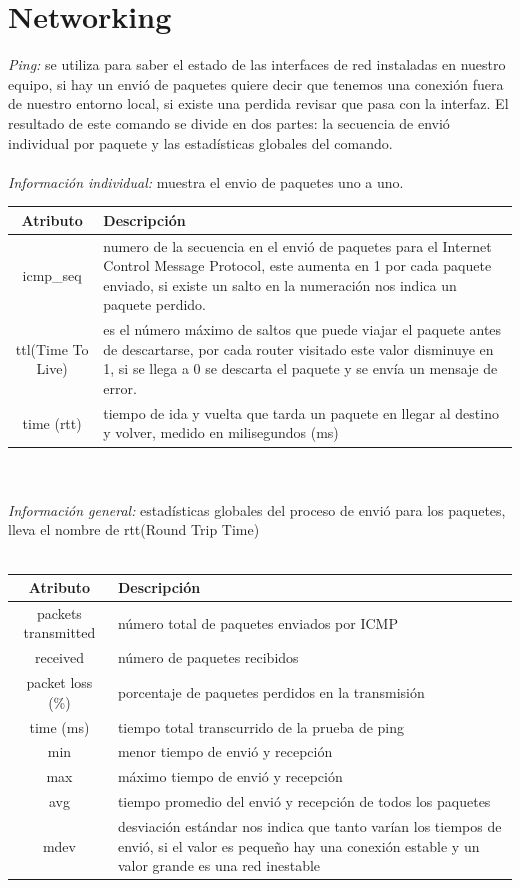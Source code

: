 \documentclass[10pt,a4paper,titlepage]{article}
\begin{document}
	\section*{Networking}
	\emph{Ping:} se utiliza para saber el estado de las interfaces de red instaladas en nuestro equipo, si hay un envió de paquetes quiere decir que tenemos una conexión fuera de nuestro entorno local, si existe una perdida revisar que pasa con la interfaz. El resultado de este comando se divide en dos partes: la secuencia de envió individual por paquete y las estadísticas globales del comando.
	\\
	\\
	\emph{Información individual:} muestra el envio de paquetes uno a uno.
	\\
	\begin{tabular}{|c|p{8cm}|}
		\hline
		Atributo & Descripción \\
		\hline
		icmp\_seq & numero de la secuencia en el envió de paquetes para el Internet Control Message Protocol, este aumenta en 1 por cada paquete enviado, si existe un salto en la numeración nos indica un paquete perdido. \\
		\hline
		ttl(Time To Live) & es el número máximo de saltos que puede viajar el paquete antes de descartarse, por cada router visitado este valor disminuye en 1, si se llega a 0 se descarta el paquete y se envía un mensaje de error. \\
		\hline
		time (rtt) & tiempo de ida y vuelta que tarda un paquete en llegar al destino y volver, medido en milisegundos (ms) \\
		\hline
	\end{tabular}
	\\
	\\
	\emph{Información general:} estadísticas globales del proceso de envió para los paquetes, lleva el nombre de rtt(Round Trip Time)
	\\
	\\
	\begin{tabular}{|c|p{8cm}|}
		\hline
		Atributo & Descripción \\
		\hline
		packets transmitted & número total de paquetes enviados por ICMP \\
		\hline
		received & número de paquetes recibidos \\
		\hline
		packet loss (\%) & porcentaje de paquetes perdidos en la transmisión \\
		\hline
		time (ms) & tiempo total transcurrido de la prueba de ping \\
		\hline
		min & menor tiempo de envió y recepción \\
		\hline
		max & máximo tiempo de envió y recepción \\
		\hline
		avg & tiempo promedio del envió y recepción de todos los paquetes \\
		\hline
		mdev & desviación estándar nos indica que tanto varían los tiempos de envió, si el valor es pequeño hay una conexión estable y un valor grande es una red inestable \\
		\hline
	\end{tabular}
\end{document}

